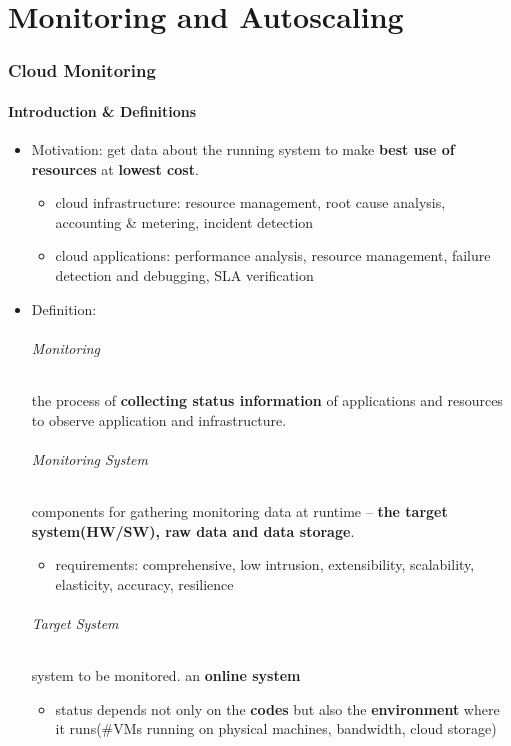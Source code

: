 \part{Monitoring and Autoscaling}

\section{Cloud Monitoring}

\subsection{Introduction \& Definitions}
\begin{itemize}
	\item Motivation: get data about the running system to make \textbf{best use of resources} at \textbf{lowest cost}.
	\begin{itemize}
		\item cloud infrastructure: resource management, root cause analysis, accounting \& metering, incident detection
		\item cloud applications: performance analysis, resource management, failure detection and debugging, SLA verification
	\end{itemize}
	\item Definition:
	\paragraph{Monitoring} the process of \textbf{collecting status information} of applications and resources to observe application and infrastructure.
	\paragraph{Monitoring System} components for gathering monitoring data at runtime -- \textbf{the target system(HW/SW), raw data and data storage}.
	\begin{itemize}
		\item requirements: comprehensive, low intrusion, extensibility, scalability, elasticity, accuracy, resilience
		
	\end{itemize}
	\paragraph{Target System} system to be monitored. an \textbf{online system}
	\begin{itemize}
		\item status depends not only on the \textbf{codes} but also the \textbf{environment} where it runs(\#VMs running on physical machines, bandwidth, cloud storage)
		

\end{itemize}
\end{itemize}
